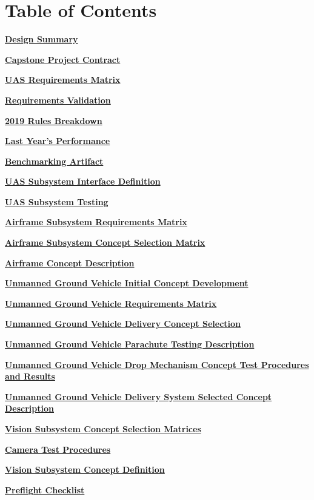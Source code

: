 \documentclass[twoside]{article} %
\newcommand{\pdflink}[2]{
\hyperlink{#1.1}{\textbf{#2}}
}
\begin{document}




\section*{Table of Contents}

\pdflink{des_sum}{Design Summary}

\pdflink{proj_cont}{Capstone Project Contract}

\pdflink{req_mat}{UAS Requirements Matrix}

\pdflink{req_val}{Requirements Validation}

\pdflink{rul_brk}{2019 Rules Breakdown}

\pdflink{last_yr}{Last Year's Performance}

\pdflink{bench}{Benchmarking Artifact}

\pdflink{ss_def}{UAS Subsystem Interface Definition}

\pdflink{ss_test}{UAS Subsystem Testing}

\pdflink{af_reqmat}{Airframe Subsystem Requirements Matrix}

\pdflink{af_select}{Airframe Subsystem Concept Selection Matrix}

\pdflink{af_def}{Airframe Concept Description}

\pdflink{ugv_init}{Unmanned Ground Vehicle Initial Concept Development}

\pdflink{ugv_reqmat}{Unmanned Ground Vehicle Requirements Matrix}

\pdflink{ugv_select}{Unmanned Ground Vehicle Delivery Concept Selection}

\pdflink{ugv_test}{Unmanned Ground Vehicle Parachute Testing Description}

\pdflink{ugv_proc}{Unmanned Ground Vehicle Drop Mechanism Concept Test Procedures and Results}

\pdflink{ugv_def}{Unmanned Ground Vehicle Delivery System Selected Concept Description}

\pdflink{vis_select}{Vision Subsystem Concept Selection Matrices}

\pdflink{vis_test}{Camera Test Procedures}

\pdflink{vis_def}{Vision Subsystem Concept Definition}

\pdflink{checklist}{Preflight Checklist}
\end{document}
